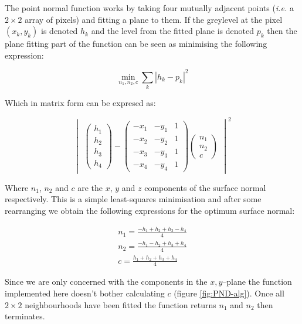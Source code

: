 \documentclass[11pt,a4paper]{article}
\begin{document}
\begin{multicols}{2}
		The point normal function works by taking four mutually adjacent points (\textit{i.e.} a $2 \times 2$ array of pixels) and fitting a plane to them. If the greylevel at the pixel $(x_k, y_k)$ is denoted $h_k$ and the level from the fitted plane is denoted $p_k$ then the plane fitting part of the function can be seen as minimising the following expression:

		\begin{equation}
			\min_{n_1, n_2, c} \sum_k |h_k - p_k|^2
		\end{equation}
		
		Which in matrix form can be expresed as:

		\begin{equation}
			\begin{vmatrix}
			\begin{pmatrix}
			h_1 \\
			h_2 \\
			h_3 \\
			h_4
			\end{pmatrix}
			-
			\begin{pmatrix}
			-x_1 & -y_1 & 1 \\
			-x_2 & -y_2 & 1 \\
			-x_3 & -y_3 & 1 \\
			-x_4 & -y_4 & 1
			\end{pmatrix}
			\begin{pmatrix}
			n_1 \\
			n_2 \\
			c
			\end{pmatrix}
			\end{vmatrix}^2
		\end{equation}

		Where $n_1$, $n_2$ and $c$ are the $x$, $y$ and $z$ components of the surface normal respectively. This is a simple least-squares minimisation and after some rearranging we obtain the following expressions for the optimum surface normal:

		\begin{equation}
		\begin{split}
			n_1 = \frac{-h_1 + h_2 + h_3 - h_4}{4} \\
			n_2 = \frac{-h_1 - h_2 + h_3 + h_4}{4} \\
			c = \frac{h_1 + h_2 + h_3 + h_4}{4}
		\end{split}
		\end{equation}

		Since we are only concerned with the components in the $x,y$--plane the function implemented here doesn't bother calculating $c$ (figure \ref{fig:PND-alg}). Once all $2 \times 2$ neighbourhoods have been fitted the function returns $n_1$ and $n_2$ then terminates.


\end{multicols}
\end{document}
